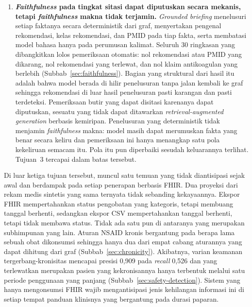 \begin{enumerate}
    \item \textbf{\emph{Faithfulness} pada tingkat sitasi dapat diputuskan secara mekanis,
    tetapi \emph{faithfulness} makna tidak terjamin.}
    \emph{Grounded briefing} menelusuri setiap faktanya secara deterministik dari graf,
    menyertakan pengenal rekomendasi, kelas rekomendasi, dan PMID pada tiap fakta, serta
    membatasi model bahasa hanya pada perumusan kalimat. Seluruh 30 ringkasan yang dibangkitkan
    lolos pemeriksaan otomatis: nol rekomendasi atau PMID yang dikarang, nol rekomendasi yang
    terlewat, dan nol klaim antikoagulan yang berlebih (Subbab~\ref{sec:faithfulness}).
    Bagian yang struktural dari hasil itu adalah bahwa model berada di hilir penelusuran tanpa
    jalan kembali ke graf sehingga rekomendasi di luar hasil penelusuran pasti karangan dan
    pasti terdeteksi. Pemeriksaan butir yang dapat disitasi karenanya dapat diputuskan, sesuatu
    yang tidak dapat ditawarkan \emph{retrieval-augmented generation} berbasis kemiripan.
    Penelusuran yang deterministik tidak menjamin \emph{faithfulness} makna: model masih dapat
    merumuskan fakta yang benar secara keliru dan pemeriksaan ini hanya menangkap satu pola
    kekeliruan semacam itu. Pola itu pun diperbaiki sesudah keluarannya terlihat. Tujuan~3
    tercapai dalam batas tersebut.
\end{enumerate}

Di luar ketiga tujuan tersebut, muncul satu temuan yang tidak diantisipasi sejak awal dan
berdampak pada setiap penerapan berbasis FHIR. Dua proyeksi dari rekam medis sintetis yang
sama ternyata tidak sebanding kekayaannya. Ekspor FHIR mempertahankan status pengobatan yang
kategoris, tetapi membuang tanggal berhenti, sedangkan ekspor CSV mempertahankan tanggal
berhenti, tetapi tidak membawa status. Tidak ada satu pun di antaranya yang merupakan
subhimpunan yang lain. Aturan NSAID kronis bergantung pada berapa lama sebuah
obat dikonsumsi sehingga hanya dua dari empat cabang aturannya yang dapat dihitung dari graf
(Subbab~\ref{sec:chronicity}). Akibatnya, varian keamanan
tergerbang-kronisitas mencapai presisi 0,909 pada \emph{recall}
0,526 dan yang terlewatkan merupakan pasien yang kekronisannya hanya
terbentuk melalui satu periode penggunaan yang panjang
(Subbab~\ref{sec:safety-detection}). Sistem yang hanya mengonsumsi FHIR wajib
mengantisipasi jenis kehilangan informasi ini di setiap tempat panduan klinisnya yang bergantung pada
durasi paparan.

